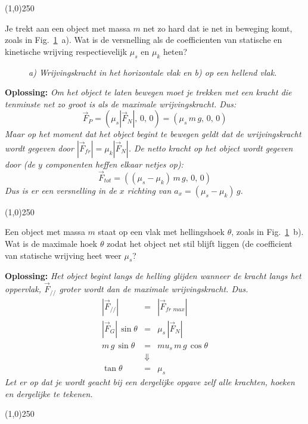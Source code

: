 \begin{center}
\line(1,0){250}
\end{center}
\begin{voorbeeld} 
\label{ex:wrijving1}
Je trekt aan een object met massa $m$ net zo hard dat ie net in beweging komt, zoals
in Fig.~\ref{fig:wrijving1}~a). Wat is de versnelling als de coefficienten van statische en
kinetische wrijving respectievelijk $\mu_s$ en $\mu_k$ heten?
\begin{figure}[htbp]
\begin{center}
\caption{{\it a) Wrijvingskracht in het horizontale vlak en b) op een hellend vlak.}}
\label{fig:wrijving1}
\end{center}
\end{figure} 

{\bf Oplossing: } {\it  Om het object te laten bewegen moet je trekken met een kracht
die tenminste net zo groot is als de maximale wrijvingskracht. Dus:
\begin{equation}
\vec{F}_P = (\mu_s |\vec{F}_N|,\,0,\,0) = (\mu_s\,m\,g,\,0,\,0)
\end{equation}
Maar op het moment dat het object begint te bewegen geldt dat de wrijvingskracht 
wordt gegeven door $|\vec{F}_{fr}| = \mu_k |\vec{F}_N|$. De netto kracht op het object wordt
gegeven door (de $y$ componenten heffen elkaar netjes op):
\begin{equation}
\vec{F}_{tot} = ((\mu_s-\mu_k)\,m\,g,\,0,\,0)
\end{equation}
Dus is er een versnelling in de $x$ richting van $a_x = (\mu_s-\mu_k)\,g$.
}
\end{voorbeeld}
\begin{center}
\line(1,0){250}
\end{center}
\begin{voorbeeld} 
\label{ex:wrijving2}
Een object met massa $m$ staat op een vlak met hellingshoek $\theta$, zoals in Fig.~\ref{fig:wrijving1}~b). 
Wat is de maximale hoek $\theta$ zodat het object net stil blijft liggen (de coefficient van statische wrijving 
heet weer $\mu_s$?

{\bf Oplossing: } {\it  Het object begint langs de helling glijden wanneer de kracht langs het oppervlak, $\vec{F}_{//}$ 
groter wordt dan de maximale wrijvingskracht. Dus.
\begin{eqnarray}
|\vec{F}_{//}| & = & |\vec{F}_{fr \,\, max}| \\
|\vec{F}_G|\,\sin\theta & = & \mu_s \, |\vec{F}_N| \\
m\,g\,\sin\theta & = & mu_s\,m\,g\,\cos\theta \\
& \Downarrow & \\
\tan\theta & = & \mu_s
\end{eqnarray}
Let er op dat je wordt geacht bij een dergelijke opgave \emph{zelf}  alle krachten, hoeken en dergelijke te tekenen.
}
\end{voorbeeld}
\begin{center}
\line(1,0){250}
\end{center}

